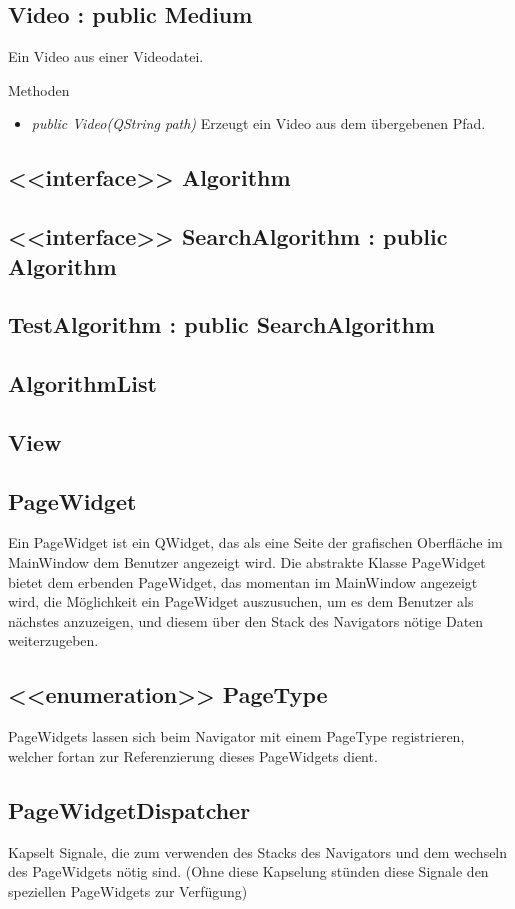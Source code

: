 \subsection*{Video : public Medium}
Ein Video aus einer Videodatei.

Methoden
\begin{itemize}
\item \textit{public Video(QString path)} Erzeugt ein Video aus dem übergebenen Pfad.
\end{itemize}

\subsection*{<<interface>> Algorithm}
\subsection*{<<interface>> SearchAlgorithm : public Algorithm}
\subsection*{TestAlgorithm : public SearchAlgorithm}
\subsection*{AlgorithmList}

\subsection{View}
\subsection*{PageWidget}
Ein PageWidget ist ein QWidget, das als eine Seite der grafischen Oberfläche im MainWindow dem Benutzer angezeigt wird. Die abstrakte Klasse PageWidget bietet dem erbenden PageWidget, das momentan im MainWindow angezeigt wird, die Möglichkeit ein PageWidget auszusuchen, um es dem Benutzer als nächstes anzuzeigen, und diesem über den Stack des Navigators nötige Daten weiterzugeben.

\subsection*{<<enumeration>> PageType}
PageWidgets lassen sich beim Navigator mit einem PageType registrieren, welcher fortan zur Referenzierung dieses PageWidgets dient.

\subsection*{PageWidgetDispatcher}
Kapselt Signale, die zum verwenden des Stacks des Navigators und dem wechseln des PageWidgets nötig sind. (Ohne diese Kapselung stünden diese Signale den speziellen PageWidgets zur Verfügung)

